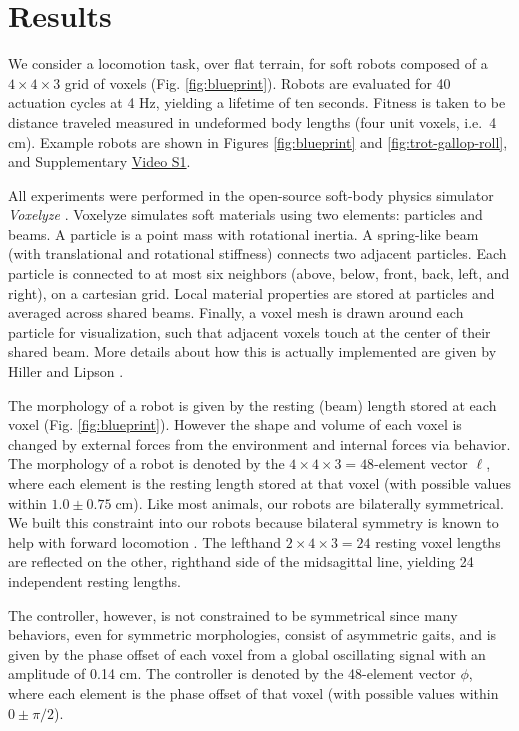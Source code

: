 \section{Results}
\label{sec4:results}

We consider a locomotion task, over flat terrain, for soft robots composed of a $4\times4\times3$ grid of voxels (Fig. \ref{fig:blueprint}).
Robots are evaluated for 40 actuation cycles at 4 Hz, yielding a lifetime of ten seconds. Fitness is taken to be distance traveled measured in undeformed body lengths (four unit voxels, i.e.~4 cm). 
Example robots are shown in Figures \ref{fig:blueprint} and \ref{fig:trot-gallop-roll}, and Supplementary \href{https://youtu.be/Ee2sU-AZWC4}{\color{blue}Video S1}.


All experiments were performed in the open-source soft-body physics simulator  
\textit{Voxelyze} \cite{hiller2014dynamic}. 
Voxelyze simulates soft materials using two elements: particles and beams. 
A particle is a point mass with rotational inertia.
A spring-like beam (with translational and rotational stiffness) connects two adjacent particles.
Each particle is connected to at most six neighbors (above, below, front, back, left, and right), on a cartesian grid.
Local material properties are stored at particles and averaged across shared beams.
Finally, a voxel mesh is drawn around each particle for visualization, such that adjacent voxels touch at the center of their shared beam.
More details about how this is actually implemented are given by Hiller and Lipson \cite{hiller2014dynamic}.

The morphology of a robot is given by the resting (beam) length stored at each voxel (Fig. \ref{fig:blueprint}).
However the shape and volume of each voxel is changed by external forces from the environment and internal forces via behavior. 
The morphology of a robot is denoted by the $4\times4\times3=48$-element vector $\ell$, where each element is the resting length stored at that voxel (with possible values within $1.0 \pm 0.75\; \text{cm}$).
Like most animals, our robots are bilaterally symmetrical.
We built this constraint into our robots because bilateral symmetry is known to help with forward locomotion
\cite{grabowsky1994symmetry}.
The lefthand $2\times4\times3=24$ resting voxel lengths are reflected on the other, righthand side of the midsagittal line, yielding 24 independent resting lengths.

The controller, however, is not constrained to be symmetrical since many behaviors, even for symmetric morphologies, consist of asymmetric gaits, and is given by the phase offset of each voxel from a global oscillating signal with an amplitude of 0.14 cm. 
The controller is denoted by the 48-element vector $\phi$, where each element is the phase offset of that voxel (with possible values within $0 \pm \pi/2$). 



